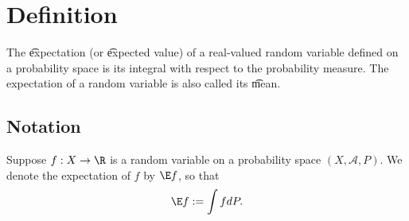 
\section*{Definition}

The \t{expectation} (or \t{expected value}) of a real-valued random variable defined on a probability space is its integral with respect to the probability measure.
The expectation of a random variable is also called its \t{mean}.

\subsection*{Notation}

Suppose $f: X \to \R $ is a random variable on a probability space $(X, \mathcal{A} , P)$.
We denote the expectation of $f$ by $\E f$, so that
\[
\E  f := \int  f dP.
\]

\blankpage
